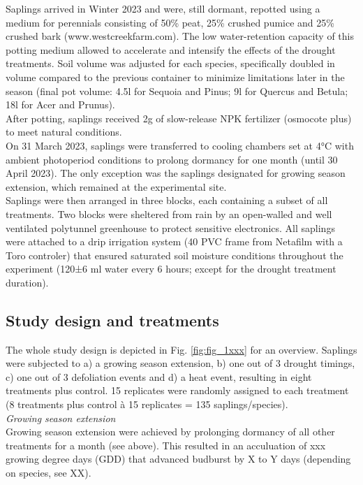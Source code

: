\documentclass{article}
\begin{document}
	Saplings arrived in Winter 2023 and were, still dormant, repotted using a medium for perennials consisting of 50\% peat, 25\% crushed pumice and 25\% crushed bark (www.westcreekfarm.com). The low water-retention capacity of this potting medium allowed to accelerate and intensify the effects of the drought treatments. Soil volume was adjusted for each species, specifically doubled in volume compared to the previous container to minimize limitations later in the season (final pot volume: 4.5l for Sequoia and Pinus; 9l for Quercus and Betula; 18l for Acer and Prunus). \\ 
	After potting, saplings received 2g of slow-release NPK fertilizer (osmocote plus) to meet natural conditions. \\ 
	On 31 March 2023, saplings were transferred to cooling chambers set at 4°C with ambient photoperiod conditions to prolong dormancy for one month (until 30 April 2023). The only exception was the saplings designated for growing season extension, which remained at the experimental site. \\ 
	Saplings were then arranged in three blocks, each containing a subset of all treatments. Two blocks were sheltered from rain by an open-walled and well ventilated polytunnel greenhouse to protect sensitive electronics. All saplings were attached to a drip irrigation system (40 PVC frame from Netafilm with a Toro controler) that ensured saturated soil moisture conditions throughout the experiment (120±6 ml water every 6 hours;  except for the drought treatment duration). \\ 
	
		\subsection*{Study design and treatments}
	The whole study design is depicted in Fig. \ref{fig:fig_1xxx} for an overview. Saplings were subjected to a) a growing season extension, b) one out of 3 drought timings, c) one out of 3 defoliation events and d) a heat event, resulting in eight treatments plus control. 15 replicates were randomly assigned to each treatment (8 treatments plus control à 15 replicates = 135 saplings/species). \\  
	
	\textit{Growing season extension} \\
	Growing season extension were achieved by prolonging dormancy of all other treatments for a month (see above). This resulted in an acculuation of xxx growing degree days (GDD) that advanced budburst by X to Y days (depending on species, see XX).\\
	
\end{document}
